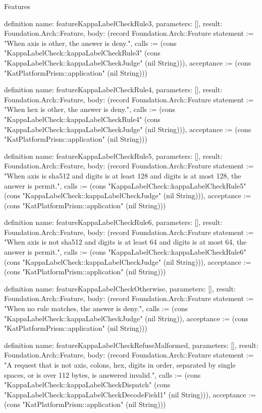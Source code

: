 \begin{lexlean}{Features}
\begin{semanticmodule}
definition{
  name: featureKappaLabelCheckRule3,
  parameters: [],
  result: Foundation.Arch::Feature,
  body: (record Foundation.Arch::Feature {statement := "When axis is other, the answer is deny.", calls := (cons "KappaLabelCheck::kappaLabelCheckRule3" (cons "KappaLabelCheck::kappaLabelCheckJudge" (nil String))), acceptance := (cons "KatPlatformPrism::application" (nil String))})
}

definition{
  name: featureKappaLabelCheckRule4,
  parameters: [],
  result: Foundation.Arch::Feature,
  body: (record Foundation.Arch::Feature {statement := "When hex is other, the answer is deny.", calls := (cons "KappaLabelCheck::kappaLabelCheckRule4" (cons "KappaLabelCheck::kappaLabelCheckJudge" (nil String))), acceptance := (cons "KatPlatformPrism::application" (nil String))})
}

definition{
  name: featureKappaLabelCheckRule5,
  parameters: [],
  result: Foundation.Arch::Feature,
  body: (record Foundation.Arch::Feature {statement := "When axis is sha512 and digits is at least 128 and digits is at most 128, the answer is permit.", calls := (cons "KappaLabelCheck::kappaLabelCheckRule5" (cons "KappaLabelCheck::kappaLabelCheckJudge" (nil String))), acceptance := (cons "KatPlatformPrism::application" (nil String))})
}

definition{
  name: featureKappaLabelCheckRule6,
  parameters: [],
  result: Foundation.Arch::Feature,
  body: (record Foundation.Arch::Feature {statement := "When axis is not sha512 and digits is at least 64 and digits is at most 64, the answer is permit.", calls := (cons "KappaLabelCheck::kappaLabelCheckRule6" (cons "KappaLabelCheck::kappaLabelCheckJudge" (nil String))), acceptance := (cons "KatPlatformPrism::application" (nil String))})
}

definition{
  name: featureKappaLabelCheckOtherwise,
  parameters: [],
  result: Foundation.Arch::Feature,
  body: (record Foundation.Arch::Feature {statement := "When no rule matches, the answer is deny.", calls := (cons "KappaLabelCheck::kappaLabelCheckJudge" (nil String)), acceptance := (cons "KatPlatformPrism::application" (nil String))})
}

definition{
  name: featureKappaLabelCheckRefuseMalformed,
  parameters: [],
  result: Foundation.Arch::Feature,
  body: (record Foundation.Arch::Feature {statement := "A request that is not axis, colons, hex, digits in order, separated by single spaces, or is over 112 bytes, is answered invalid.", calls := (cons "KappaLabelCheck::kappaLabelCheckDispatch" (cons "KappaLabelCheck::kappaLabelCheckDecodeField1" (nil String))), acceptance := (cons "KatPlatformPrism::application" (nil String))})
}


\end{semanticmodule}
\end{lexlean}
